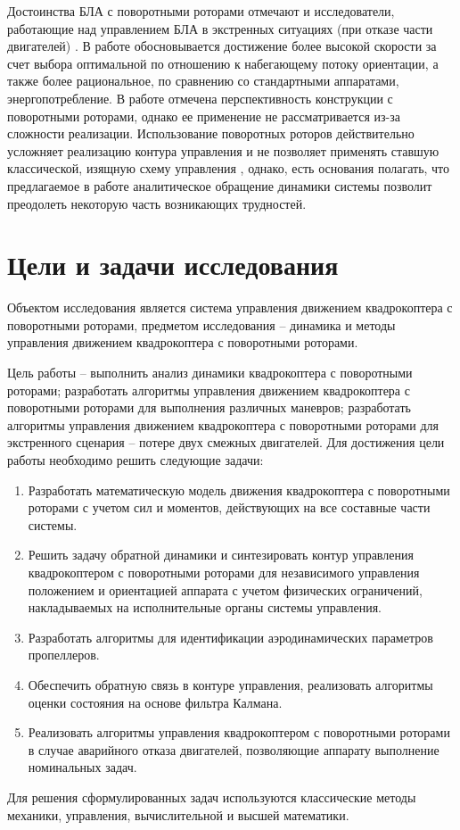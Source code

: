 Достоинства БЛА с поворотными роторами отмечают и исследователи, работающие над управлением БЛА в экстренных ситуациях (при отказе части двигателей) \cite{Morozov01, Shidar00}.
В работе \cite{Shidar00} обосновывается достижение более высокой скорости за счет выбора оптимальной по отношению к набегающему потоку ориентации, а также более рациональное, по сравнению со стандартными аппаратами, энергопотребление.
В работе \cite{Morozov01} отмечена перспективность конструкции с поворотными роторами, однако ее применение не рассматривается из-за сложности реализации.
Использование поворотных роторов действительно усложняет реализацию контура управления \cite{Ryll01, Falconi01, Segui01, Oosedo01} и не позволяет применять ставшую классической, изящную схему управления \cite{Mellinger01}, однако, есть основания полагать, что предлагаемое в работе аналитическое обращение динамики системы позволит преодолеть некоторую часть возникающих трудностей.

\section{Цели и задачи исследования}

Объектом исследования является система управления движением квадрокоптера с поворотными роторами, предметом исследования -- динамика и методы управления движением квадрокоптера с поворотными роторами.

Цель работы -- выполнить анализ динамики квадрокоптера с поворотными роторами;
разработать алгоритмы управления движением квадрокоптера с поворотными роторами для выполнения различных маневров; разработать алгоритмы управления движением квадрокоптера с поворотными роторами для экстренного сценария -- потере двух смежных двигателей. Для достижения цели работы необходимо решить следующие задачи:
\begin{enumerate}
	\item Разработать математическую модель движения квадрокоптера с поворотными роторами с учетом сил и моментов, действующих на все составные части системы.
	\item Решить задачу обратной динамики и синтезировать контур управления квадрокоптером с поворотными роторами для независимого управления положением и ориентацией аппарата с учетом физических ограничений, накладываемых на исполнительные органы системы управления.
	\item Разработать алгоритмы для идентификации аэродинамических параметров пропеллеров.
	\item Обеспечить обратную связь в контуре управления, реализовать алгоритмы оценки состояния на основе фильтра Калмана.
	\item Реализовать алгоритмы управления квадрокоптером с поворотными роторами в случае аварийного отказа  двигателей, позволяющие аппарату выполнение номинальных задач.
\end{enumerate}
Для решения сформулированных задач используются классические методы механики, управления, вычислительной и высшей математики.

